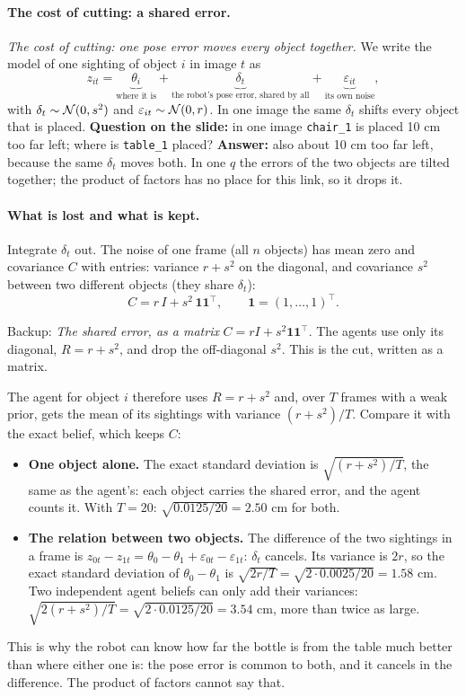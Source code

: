 \documentclass[11pt]{article}
\newcommand{\one}{\mathbf 1}
\newcommand{\slt}[1]{\emph{#1}}   %
\begin{document}
\paragraph{The cost of cutting: a shared error.} \slt{The cost of cutting: one pose error moves every object together.} We write the model of one sighting of object $i$ in image $t$ as
\[
z_{it}=\underbrace{\theta_i}_{\text{where it is}}+\underbrace{\delta_t}_{\text{the robot's pose error, shared by all}}+\underbrace{\varepsilon_{it}}_{\text{its own noise}},
\]
with $\delta_t\sim\mathcal{N}(0,s^2)$ and $\varepsilon_{it}\sim\mathcal{N}(0,r)$. In one image the same $\delta_t$ shifts every object that is placed. \textbf{Question on the slide:} in one image \texttt{chair\_1} is placed 10 cm too far left; where is \texttt{table\_1} placed? \textbf{Answer:} also about 10 cm too far left, because the same $\delta_t$ moves both. In one $q$ the errors of the two objects are tilted together; the product of factors has no place for this link, so it drops it.

\paragraph{What is lost and what is kept.} Integrate $\delta_t$ out. The noise of one frame (all $n$ objects) has mean zero and covariance $C$ with entries: variance $r+s^2$ on the diagonal, and covariance $s^2$ between two different objects (they share $\delta_t$):
\[
C=r\,I+s^2\,\one\one^{\top},\qquad \one=(1,\dots,1)^{\top}.
\]
\begin{backupbox}{Backup: \emph{The shared error, as a matrix}}
$C=rI+s^2\one\one^\top$. The agents use only its diagonal, $R=r+s^2$, and drop the off-diagonal $s^2$. This is the cut, written as a matrix.
\end{backupbox}
The agent for object $i$ therefore uses $R=r+s^2$ and, over $T$ frames with a weak prior, gets the mean of its sightings with variance $(r+s^2)/T$. Compare it with the exact belief, which keeps $C$:
\begin{itemize}
\item \textbf{One object alone.} The exact standard deviation is $\sqrt{(r+s^2)/T}$, the same as the agent's: each object carries the shared error, and the agent counts it. With $T=20$: $\sqrt{0.0125/20}=2.50$ cm for both.
\item \textbf{The relation between two objects.} The difference of the two sightings in a frame is $z_{0t}-z_{1t}=\theta_0-\theta_1+\varepsilon_{0t}-\varepsilon_{1t}$: $\delta_t$ cancels. Its variance is $2r$, so the exact standard deviation of $\theta_0-\theta_1$ is $\sqrt{2r/T}=\sqrt{2\cdot0.0025/20}=1.58$ cm. Two independent agent beliefs can only add their variances: $\sqrt{2(r+s^2)/T}=\sqrt{2\cdot 0.0125/20}=3.54$ cm, more than twice as large.
\end{itemize}
This is why the robot can know how far the bottle is from the table much better than where either one is: the pose error is common to both, and it cancels in the difference. The product of factors cannot say that.
\end{document}
